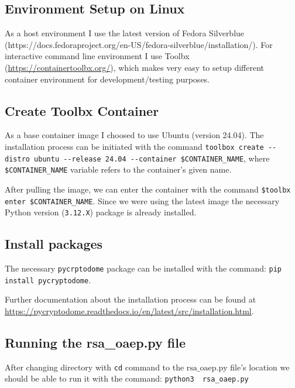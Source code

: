 \documentclass[10pt,a4paper]{article}
\begin{document}
\begin{appendix}
\section{Environment Setup on Linux}

As a host environment I use the latest version of Fedora Silverblue (https://docs.fedoraproject.org/en-US/fedora-silverblue/installation/). For interactive command line environment I use Toolbx (\url{https://containertoolbx.org/}), which makes very easy to setup different container environment for development/testing purposes.

\subsection{Create Toolbx Container}

As a base container image I choosed to use Ubuntu (version 24.04).
The installation process can be initiated with the command \lstinline{toolbox create --distro ubuntu --release 24.04 --container $CONTAINER_NAME}, where \lstinline{$CONTAINER_NAME} variable refers to the container's given name.

After pulling the image, we can enter the container with the command \lstinline{$toolbx enter $CONTAINER_NAME}.
Since we were using the latest image the necessary Python version (\lstinline{3.12.X}) package is already installed.

\subsection{Install packages}

The necessary \lstinline{pycrptodome} package can be installed with the command: 
\lstinline{pip install pycryptodome}. 

Further documentation about the installation process can be found at \url{https://pycryptodome.readthedocs.io/en/latest/src/installation.html}.

\subsection{Running the rsa\_oaep.py file}

After changing directory with \lstinline{cd} command to the $\mathrm{rsa\_oaep.py}$ file's location we should be able to run it with the command: \lstinline{python3  rsa_oaep.py}
\label{app:env-setup}
\end{appendix}
\end{document}
